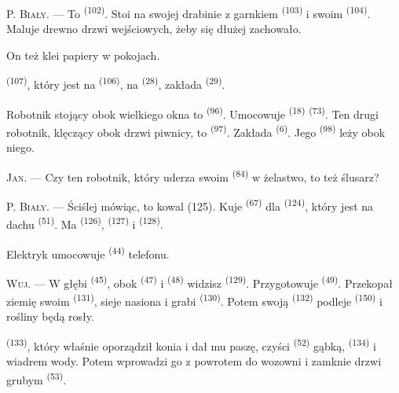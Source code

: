 P. \textsc{Biały}. --- To  \textsuperscript{(102)}. Stoi na swojej
drabinie z garnkiem  \textsuperscript{(103)} i swoim 
\textsuperscript{(104)}. Maluje drewno drzwi wejściowych, żeby się dłużej zachowało.

On też klei papiery w pokojach.

 \textsuperscript{(107)}, który jest na 
\textsuperscript{(106)}, na  \textsuperscript{(28)}, zakłada
 \textsuperscript{(29)}.

Robotnik stojący obok wielkiego okna to  \textsuperscript{(96)}.
Umocowuje  \textsuperscript{(18)}  \textsuperscript{(73)}.
Ten drugi robotnik, klęczący obok drzwi piwnicy, to 
\textsuperscript{(97)}. Zakłada  \textsuperscript{(6)}. Jego
 \textsuperscript{(98)} leży obok niego.

\textsc{Jan}. --- Czy ten robotnik, który uderza swoim 
\textsuperscript{(84)} w żelastwo, to też ślusarz?

P. \textsc{Biały}. --- Ściślej mówiąc, to kowal (125). Kuje 
\textsuperscript{(67)} dla  \textsuperscript{(124)}, który jest na
dachu  \textsuperscript{(51)}. Ma 
\textsuperscript{(126)},  \textsuperscript{(127)} i 
\textsuperscript{(128)}.

Elektryk umocowuje  \textsuperscript{(44)}  telefonu.

\VUsaut{3.0mm}

\textsc{Wuj}. --- W głębi  \textsuperscript{(45)}, obok 
\textsuperscript{(47)} i  \textsuperscript{(48)} widzisz
 \textsuperscript{(129)}. Przygotowuje 
\textsuperscript{(49)}. Przekopał ziemię swoim  \textsuperscript{(131)},
sieje nasiona i grabi  \textsuperscript{(130)}. Potem swoją
 \textsuperscript{(132)} podleje 
\textsuperscript{(150)} i rośliny będą rosły.

 \textsuperscript{(133)}, który właśnie oporządził konia i dał mu
paszę, czyści  \textsuperscript{(52)} gąbką, 
\textsuperscript{(134)} i wiadrem wody. Potem wprowadzi go z powrotem do wozowni i
zamknie drzwi grubym  \textsuperscript{(53)}.

